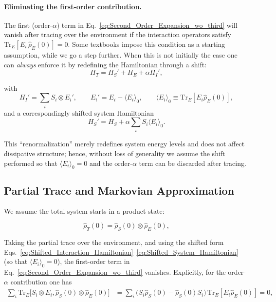 \paragraph{Eliminating the first-order contribution.}

\noindent
The first (order-$\alpha$) term in Eq.~\eqref{eq:Second_Order_Expansion_wo_third} will vanish after tracing over the environment if the interaction operators satisfy $\mathrm{Tr}_E[E_i \, \hat{\rho}_E(0)] = 0$. Some textbooks impose this condition as a starting assumption, while we go a step further. When this is not initially the case one can \emph{always} enforce it by redefining the Hamiltonian through a shift:
\begin{equation}
	H_T = H_S' + H_E + \alpha H_I',
	\label{eq:Shifted_Total_Hamiltonian}
\end{equation}

\noindent
with
\begin{equation}
	H_I' = \sum_i S_i \otimes E_i', \qquad E_i' = E_i - \langle E_i \rangle_0, \qquad \langle E_i \rangle_0 \equiv \mathrm{Tr}_E[E_i \hat{\rho}_E(0)],
	\label{eq:Shifted_Interaction_Hamiltonian}
\end{equation}
and a correspondingly shifted system Hamiltonian
\begin{equation}
	H_S' = H_S + \alpha \sum_i S_i \langle E_i \rangle_0.
	\label{eq:Shifted_System_Hamiltonian}
\end{equation}

\noindent
This ``renormalization'' merely redefines system energy levels and does not affect dissipative structure; hence, without loss of generality we assume the shift performed so that $\langle E_i \rangle_0 = 0$ and the order-$\alpha$ term can be discarded after tracing.

\subsection{Partial Trace and Markovian Approximation}

\noindent
We assume the total system starts in a product state:

\begin{equation}
	\hat{\rho}_T(0) = \hat{\rho}_S(0) \otimes \hat{\rho}_E(0),
	\label{eq:Initial_Product_State}
\end{equation}

\noindent
Taking the partial trace over the environment, and using the shifted form Eqs.~\eqref{eq:Shifted_Interaction_Hamiltonian}--\eqref{eq:Shifted_System_Hamiltonian} (so that $\langle E_i \rangle_0 = 0$), the first-order term in Eq.~\eqref{eq:Second_Order_Expansion_wo_third} vanishes. Explicitly, for the order-$\alpha$ contribution one has
\begin{align}
	\sum_i \mathrm{Tr}_E\big[ S_i \otimes E_i, \hat{\rho}_S(0) \otimes \hat{\rho}_E(0)\big]
	 & = \sum_i \big(S_i \hat{\rho}_S(0) - \hat{\rho}_S(0) S_i\big) \, \mathrm{Tr}_E[E_i \hat{\rho}_E(0)] = 0,
	\label{eq:Trace_Relation_first_part}
\end{align}

